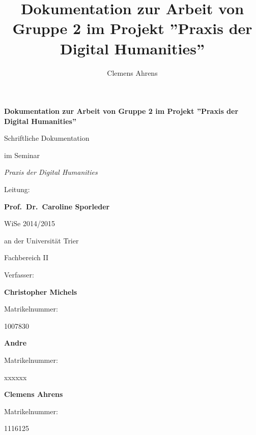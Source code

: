 \documentclass[a4paper,12pt,titlepage=true, ngerman]{scrartcl}
\title{Dokumentation zur Arbeit von Gruppe 2 im Projekt ''Praxis der Digital Humanities''} %
\author{Clemens Ahrens}
\begin{document}
\begin{titlepage}

\begin{center}

\vspace*{100pt}

\large\textbf{Dokumentation zur Arbeit von Gruppe 2 im Projekt ''Praxis der Digital Humanities''}%

\vfill

Schriftliche Dokumentation

im Seminar

\emph{Praxis der Digital Humanities}


Leitung:

\textbf{Prof.\ Dr.\ Caroline Sporleder}%

WiSe 2014/2015%

\bigskip

an der Universität Trier

Fachbereich II

\bigskip

\bigskip

Verfasser:

\textbf{Christopher Michels} %

Matrikelnummer:

1007830

\textbf{Andre} %

Matrikelnummer:

xxxxxx

\textbf{Clemens Ahrens}

Matrikelnummer:

1116125



\end{center}

\end{titlepage}

 \tableofcontents%


\newpage





% 

% 

% 

% 

\printbibliography[title=Literaturverzeichnis, heading=bibintoc]
\newpage
\listoffigures
\listoftables
\newpage


\end{document}
